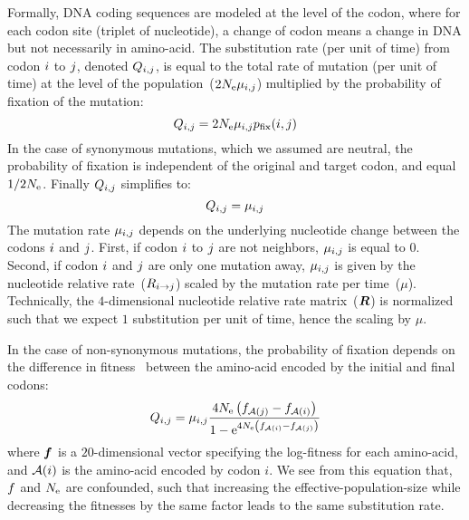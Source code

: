 Formally, DNA coding sequences are modeled at the level of the \gls{codon}, where for each codon site (triplet of nucleotide), a change of \gls{codon} means a change in \acrshort{DNA} but not necessarily in amino-acid.
The \gls{substitution} rate (per unit of time) from \gls{codon} ${i}$ to ${j}$, denoted $Q_{{i}, {j}}$, is equal to the total rate of mutation (per unit of time) at the level of the population~($2N_{\mathrm{e}}\mu_{{i}, {j}}$) multiplied by the probability of fixation of the mutation:
\begin{equation}
{Q_{{i}, {j}}}
    = 2 N_{\mathrm{e}} \mu_{{i}, {j}} p_{\mathrm{fix}}({i}, {j})
\end{equation}
In the case of synonymous mutations, which we assumed are \gls{neutral}, the probability of fixation is independent of the original and target \gls{codon}, and equal $1/2 N_{\mathrm{e}}$.
Finally ${Q_{{i}, {j}}}$ simplifies to:
\begin{equation}
    Q_{{i}, {j}} = \mu_{{i}, {j}}
\end{equation}
The mutation rate $\mu_{{i}, {j}}$ depends on the underlying nucleotide change between the \glspl{codon} ${i}$ and ${j}$.
First, if \gls{codon} ${i}$ to ${j}$ are not neighbors, $\mu_{{i}, {j}}$ is equal to $0$.
Second, if \gls{codon} ${i}$ and ${j}$ are only one mutation away, $\mu_{{i}, {j}}$ is given by the nucleotide relative rate~(${R_{{i} \rightarrow {j}}}$) scaled by the mutation rate per time~($\mu$).
Technically, the $4$-dimensional nucleotide relative rate matrix~($\bm{R}$) is normalized such that we expect $1$ \gls{substitution} per unit of time, hence the scaling by $\mu$.

In the case of non-synonymous mutations, the probability of fixation depends on the difference in fitness~\citep{Ohta1992} between the amino-acid encoded by the initial and final \glspl{codon}:
\begin{equation}
    \label{eq:mutationSelection}
    {\submatrix_{\itoj}} = \mu_{\itoj} \dfrac{4 \Ne \left({\fitj - \fiti}\right)}{{1 - \e^{4 \Ne \left({\fiti - \fitj}\right)} }}
\end{equation}
where $\bm{f}$ is a $20$-dimensional vector specifying the log-fitness for each amino-acid, and $\mathcal{A}({i})$ is the amino-acid encoded by \gls{codon} $i$.
We see from this equation that, $f$ and $N_{\mathrm{e}}$ are confounded, such that increasing the \gls{effective-population-size} while decreasing the fitnesses by the same factor leads to the same \gls{substitution} rate.

